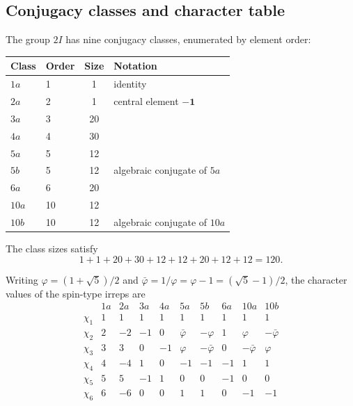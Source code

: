 \documentclass[11pt,a4paper]{article}
\begin{document}
    \subsection{Conjugacy classes and character table}
      \label{sec:step5-chars}

      The group $2I$ has nine conjugacy classes, enumerated by element order:
      \begin{center}
        \begin{tabular}{llcl}
          \hline
          Class & Order & Size & Notation                      \\
          \hline
          $1a$  & 1     & 1    & identity                      \\
          $2a$  & 2     & 1    & central element $-\mathbf{1}$ \\
          $3a$  & 3     & 20   &                               \\
          $4a$  & 4     & 30   &                               \\
          $5a$  & 5     & 12   &                               \\
          $5b$  & 5     & 12   & algebraic conjugate of $5a$   \\
          $6a$  & 6     & 20   &                               \\
          $10a$ & 10    & 12   &                               \\
          $10b$ & 10    & 12   & algebraic conjugate of $10a$  \\
          \hline
        \end{tabular}
      \end{center}
      The class sizes satisfy
      \[
        1+1+20+30+12+12+20+12+12 = 120.
      \]

      Writing $\varphi = (1+\sqrt{5})/2$ and
      $\bar\varphi = 1/\varphi = \varphi - 1 = (\sqrt{5}-1)/2$, the character
      values of the spin-type irreps are
      \begin{equation}
        \renewcommand{\arraystretch}{1.3}
        \begin{array}{l|rrrrrrrrr}
          & 1a & 2a & 3a & 4a & 5a & 5b & 6a & 10a & 10b \\
          \hline
          \chi_1 & 1 &  1 &  1 &  1 &  1 &  1 &  1 &  1 &  1 \\
          \chi_2 & 2 & -2 & -1 &  0 & \bar\varphi & -\varphi & 1 & \varphi & -\bar\varphi \\
          \chi_3 & 3 &  3 &  0 & -1 & \varphi & -\bar\varphi & 0 & -\bar\varphi & \varphi \\
          \chi_4 & 4 & -4 &  1 &  0 & -1 & -1 & -1 & 1 & 1 \\
          \chi_5 & 5 &  5 & -1 &  1 &  0 &  0 & -1 & 0 & 0 \\
          \chi_6 & 6 & -6 &  0 &  0 &  1 &  1 &  0 & -1 & -1
        \end{array}
        \label{eq:CT-2I}
      \end{equation}
\end{document}
